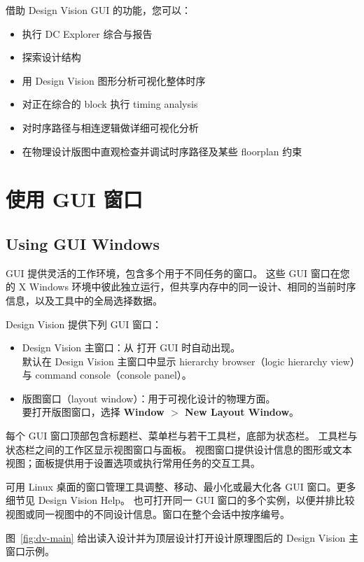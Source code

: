 借助 Design Vision GUI 的功能，您可以：
\begin{itemize}
  \item 执行 DC Explorer 综合与报告
  \item 探索设计结构
  \item 用 Design Vision 图形分析可视化整体时序
  \item 对正在综合的 block 执行 timing analysis
  \item 对时序路径与相连逻辑做详细可视化分析
  \item 在物理设计版图中直观检查并调试时序路径及某些 floorplan 约束
\end{itemize}

\section{使用 GUI 窗口}
\subsection*{Using GUI Windows}

GUI 提供灵活的工作环境，包含多个用于不同任务的窗口。
这些 GUI 窗口在您的 X Windows 环境中彼此独立运行，但共享内存中的同一设计、相同的当前时序信息，以及工具中的全局选择数据。

Design Vision 提供下列 GUI 窗口：
\begin{itemize}
  \item Design Vision 主窗口：从  打开 GUI 时自动出现。\\
        默认在 Design Vision 主窗口中显示 hierarchy browser（logic hierarchy view）与 command console（console panel）。
  \item 版图窗口（layout window）：用于可视化设计的物理方面。\\
        要打开版图窗口，选择 \textbf{Window $>$ New Layout Window}。
\end{itemize}

每个 GUI 窗口顶部包含标题栏、菜单栏与若干工具栏，底部为状态栏。
工具栏与状态栏之间的工作区显示视图窗口与面板。
视图窗口提供设计信息的图形或文本视图；面板提供用于设置选项或执行常用任务的交互工具。

可用 Linux 桌面的窗口管理工具调整、移动、最小化或最大化各 GUI 窗口。更多细节见 Design Vision Help。
也可打开同一 GUI 窗口的多个实例，以便并排比较视图或同一视图中的不同设计信息。窗口在整个会话中按序编号。

图~\ref{fig:dv-main} 给出读入设计并为顶层设计打开设计原理图后的 Design Vision 主窗口示例。

